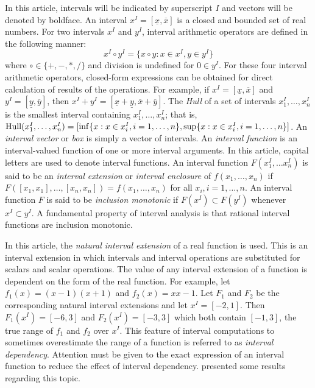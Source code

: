 \documentclass[10pt,twoside]{article}
\begin{document}
In this article, intervals will be indicated by superscript $I$ and vectors
will
be denoted by boldface.
An interval $x^I = [\underline{x}, \overline{x}]$ 
is a closed and bounded set of
real numbers.  For two intervals $x^I$ and $y^I$, 
interval arithmetic operators are defined in the following manner:
$$
x^I \circ y^I =  \{x\circ y : x \in x^I, y \in y^I \}
$$
where $\circ \in \{+,-,*,/ \}$ and division is undefined for $0 \in y^I$.
For these four interval arithmetic operators, closed-form expressions can be
obtained for direct calculation of results of the operations.
For example, if $x^I = [\underline{x},\overline{x}]$ and 
$y^I = [\underline{y},\overline{y}]$, then
$ x^I + y^I = [\underline{x}+\underline{y}, \overline{x}+\overline{y}]$.
The {\it Hull} of a set of intervals $x_1^I,\ldots,x_n^I$ is the smallest
interval containing $x_1^I,\ldots,x_n^I$; that is,
${\rm Hull}(x_1^I,\ldots,x_n^I) = [\inf\{x : x\in x_i^I, i=1,\ldots,n\}, 
\sup\{x : x\in x_i^I, i=1,\ldots,n\}]$.
An {\it interval vector} or {\it box} is simply a vector of intervals.
An {\it interval function} is an interval-valued function of one or more
interval arguments.
In this article, capital letters are used to denote interval functions.
An interval function $F(x^I_1, \ldots x_n^I)$ 
is said to be an
{\it interval extension} or {\it interval enclosure} 
of $f(x_1, \ldots, x_n)$ if 
$F([x_1,x_1], \ldots, [x_n,x_n]) = f(x_1, \ldots, x_n)$
for all $x_i, i=1,\ldots,n$.
An interval function $F$ is said to be {\it inclusion monotonic} if 
$F(x^I) \subset F(y^I)$ 
whenever $x^I \subset y^I$.
A fundamental property of interval analysis is that rational interval
functions are inclusion monotonic.

In this article, the {\it natural interval extension} of a real function 
is used.  This is an interval extension
in which intervals and interval operations 
are substituted for scalars and scalar operations.
The value of any interval extension of 
a function
is dependent on the form of the real function.  For example,
let $f_1 (x) = (x-1)(x+1)$ and $f_2 (x) = xx-1$.
Let $F_1$ and $F_2$ be the corresponding natural interval
extensions and let $x^I = [-2,1]$.  Then
$F_1(x^I) = [-6, 3]$ and $F_2(x^I) = [-3, 3]$
which both contain $[-1, 3]$, the true range of $f_1$ and $f_2$ over $x^I$.
This feature of interval computations to sometimes
overestimate the range of a function
is referred to as {\it interval dependency}.  Attention must be given to the
exact expression of an interval
function to reduce the effect of interval dependency.
\cite{Hansen:Sharp,HansenBook} presented some results regarding this topic.
\end{document}
